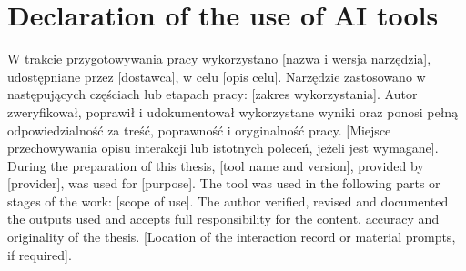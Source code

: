 \cleardoublepage
\chapter*{
                    {Declaration of the use of AI tools}}
{}

\ploren
  {W trakcie przygotowywania pracy wykorzystano [nazwa i wersja narzędzia], udostępniane przez [dostawca], w celu [opis celu]. Narzędzie zastosowano w następujących częściach lub etapach pracy: [zakres wykorzystania]. Autor zweryfikował, poprawił i udokumentował wykorzystane wyniki oraz ponosi pełną odpowiedzialność za treść, poprawność i oryginalność pracy. [Miejsce przechowywania opisu interakcji lub istotnych poleceń, jeżeli jest wymagane].}
  {During the preparation of this thesis, [tool name and version], provided by [provider], was used for [purpose]. The tool was used in the following parts or stages of the work: [scope of use]. The author verified, revised and documented the outputs used and accepts full responsibility for the content, accuracy and originality of the thesis. [Location of the interaction record or material prompts, if required].}

